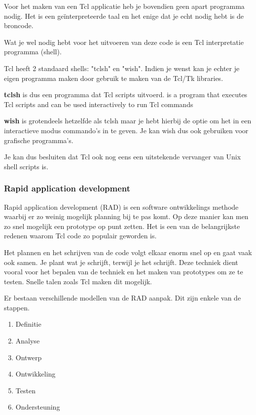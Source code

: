 \documentclass{article}
\begin{document}
\begin{flushleft}
Voor het maken van een Tcl applicatie heb je bovendien geen apart programma nodig. Het is een geïnterpreteerde taal en het enige dat je echt nodig hebt is de broncode.\medskip

Wat je wel nodig hebt voor het uitvoeren van deze code is een Tcl interpretatie programma (shell).\medskip

Tcl heeft 2 standaard shells: "tclsh" en "wish". Indien je wenst kan je echter je eigen programma maken door gebruik te maken van de Tcl/Tk libraries.\medskip

\textbf{tclsh} is dus een programma dat Tcl scripts uitvoerd. is a program that executes Tcl scripts and can be used interactively to run Tcl commands\medskip

\textbf{wish} is grotendeels hetzelfde als tclsh maar je hebt hierbij de optie om het in een interactieve modus commando's in te geven. Je kan wish dus ook gebruiken voor grafische programma's.\medskip

Je kan dus besluiten dat Tcl ook nog eens een uitstekende vervanger van Unix shell scripts is.

\subsubsection{Rapid application development}
Rapid application development (RAD) is een software ontwikkelings methode waarbij er zo weinig mogelijk planning bij te pas komt. Op deze manier kan men zo snel mogelijk een prototype op punt zetten. Het is een van de belangrijkste redenen waarom Tcl code zo populair geworden is.\medskip

Het plannen en het schrijven van de code volgt elkaar enorm snel op en gaat vaak ook samen. Je plant wat je schrijft, terwijl je het schrijft. Deze techniek dient vooral voor het bepalen van de techniek en het maken van prototypes om ze te testen. Snelle talen zoals Tcl maken dit mogelijk.\medskip

Er bestaan verschillende modellen van de RAD aanpak. Dit zijn enkele van de stappen.
\begin{enumerate}
	\item    Definitie
	\item    Analyse
	\item    Ontwerp 
	\item    Ontwikkeling
	\item    Testen
	\item    Ondersteuning
\end{enumerate}


\end{flushleft}
\end{document}
